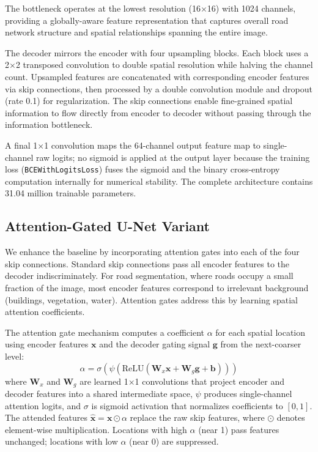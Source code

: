\documentclass[conference]{IEEEtran}
\begin{document}
The bottleneck operates at the lowest resolution (16$\times$16) with 1024 channels, providing a globally-aware feature representation that captures overall road network structure and spatial relationships spanning the entire image.

The decoder mirrors the encoder with four upsampling blocks. Each block uses a 2$\times$2 transposed convolution to double spatial resolution while halving the channel count. Upsampled features are concatenated with corresponding encoder features via skip connections, then processed by a double convolution module and dropout (rate 0.1) for regularization. The skip connections enable fine-grained spatial information to flow directly from encoder to decoder without passing through the information bottleneck.

A final 1$\times$1 convolution maps the 64-channel output feature map to single-channel raw logits; no sigmoid is applied at the output layer because the training loss (\texttt{BCEWithLogitsLoss}) fuses the sigmoid and the binary cross-entropy computation internally for numerical stability. The complete architecture contains 31.04 million trainable parameters.

\subsection{Attention-Gated U-Net Variant}

We enhance the baseline by incorporating attention gates \cite{b2} into each of the four skip connections. Standard skip connections pass all encoder features to the decoder indiscriminately. For road segmentation, where roads occupy a small fraction of the image, most encoder features correspond to irrelevant background (buildings, vegetation, water). Attention gates address this by learning spatial attention coefficients.

The attention gate mechanism computes a coefficient $\alpha$ for each spatial location using encoder features $\mathbf{x}$ and the decoder gating signal $\mathbf{g}$ from the next-coarser level:
\begin{equation}
\alpha = \sigma(\psi(\text{ReLU}(\mathbf{W}_x \mathbf{x} + \mathbf{W}_g \mathbf{g} + \mathbf{b})))
\end{equation}
where $\mathbf{W}_x$ and $\mathbf{W}_g$ are learned 1$\times$1 convolutions that project encoder and decoder features into a shared intermediate space, $\psi$ produces single-channel attention logits, and $\sigma$ is sigmoid activation that normalizes coefficients to $[0,1]$. The attended features $\hat{\mathbf{x}} = \mathbf{x} \odot \alpha$ replace the raw skip features, where $\odot$ denotes element-wise multiplication. Locations with high $\alpha$ (near 1) pass features unchanged; locations with low $\alpha$ (near 0) are suppressed.
\end{document}

